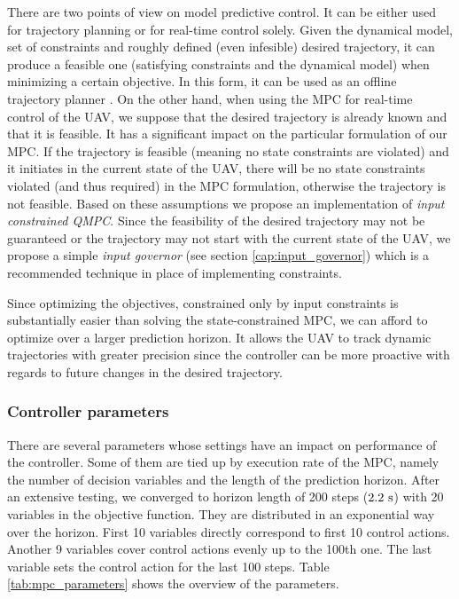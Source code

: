 There are two points of view on model predictive control. It can be either used for trajectory planning or for real-time control solely. Given the dynamical model, set of constraints and roughly defined (even infesible) desired trajectory, it can produce a feasible one (satisfying constraints and the dynamical model) when minimizing a certain objective. In this form, it can be used as an offline trajectory planner \citep{saska2014formations}. On the other hand, when using the MPC for real-time control of the UAV, we suppose that the desired trajectory is already known and that it is feasible. It has a significant impact on the particular formulation of our MPC. If the trajectory is feasible (meaning no state constraints are violated) and it initiates in the current state of the UAV, there will be no state constraints violated (and thus required) in the MPC formulation, otherwise the trajectory is not feasible. Based on these assumptions we propose an implementation of \emph{input constrained QMPC}. Since the feasibility of the desired trajectory may not be guaranteed or the trajectory may not start with the current state of the UAV, we propose a simple \emph{input governor} (see section \ref{cap:input_governor}) which is a recommended technique \citep{rossiter2013mpcpracticalapproach} in place of implementing constraints.

Since optimizing the objectives, constrained only by input constraints is substantially easier than solving the state-constrained MPC, we can afford to optimize over a larger prediction horizon. It allows the UAV to track dynamic trajectories with greater precision since the controller can be more proactive with regards to future changes in the desired trajectory.  

\subsubsection{Controller parameters}
\label{cap:implementation_performance}

There are several parameters whose settings have an impact on performance of the controller. Some of them are tied up by execution rate of the MPC, namely the number of decision variables and the length of the prediction horizon.  After an extensive testing, we converged to horizon length of 200 steps ($2.2~\mathrm{s}$) with 20 variables in the objective function. They are distributed in an exponential way over the horizon. First 10 variables directly correspond to first 10 control actions. Another 9 variables cover control actions evenly up to the 100th one. The last variable sets the control action for the last 100 steps. Table \ref{tab:mpc_parameters} shows the overview of the parameters.

